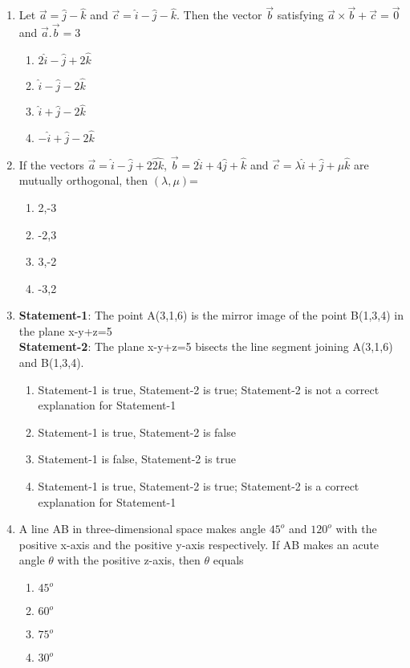 \begin{enumerate}[label=\arabic*.,ref=\thesubsection.\theenumi]
\item Let $\overrightarrow{a}=\hat{j}-\hat{k}$ and $\overrightarrow{c}=\hat{i}-\hat{j}-\hat{k}$. Then the vector $\overrightarrow{b}$ satisfying $\overrightarrow{a} \times \overrightarrow{b} + \overrightarrow{c}=\overrightarrow{0}$ and $\overrightarrow{a}.\overrightarrow{b}=3$
\begin{enumerate}
\item $2\hat{i}-\hat{j}+2\hat{k}$
\item $\hat{i}-\hat{j}-2\hat{k}$
\item $\hat{i}+\hat{j}-2\hat{k}$
\item $-\hat{i}+\hat{j}-2\hat{k}$
\end{enumerate}

\item If the vectors $\overrightarrow{a}=\hat{i}-\hat{j}+2\hat{2k}$, $\overrightarrow{b}=2\hat{i}+4\hat{j}+\hat{k}$ and $\overrightarrow{c}=\lambda\hat{i}+\hat{j}+\mu\hat{k}$ are mutually orthogonal, then $(\lambda, \mu)$=
\begin{enumerate}
\item 2,-3
\item -2,3
\item 3,-2
\item -3,2
\end{enumerate}

\item \textbf{Statement-1}: The point A(3,1,6) is the mirror image of the point B(1,3,4) in the plane x-y+z=5\\
\textbf{Statement-2}: The plane x-y+z=5 bisects the line segment joining A(3,1,6) and B(1,3,4).
\begin{enumerate}
\item Statement-1 is true, Statement-2 is true; Statement-2 is not a correct explanation for Statement-1
\item Statement-1 is true, Statement-2 is false
\item Statement-1 is false, Statement-2 is true
\item Statement-1 is true, Statement-2 is true; Statement-2 is a correct explanation for Statement-1
\end{enumerate}

\item A line AB in three-dimensional space makes angle $45^{o}$ and $120^{o}$ with the positive x-axis and the positive y-axis respectively. If AB makes an acute angle $\theta$ with the positive z-axis, then $\theta$ equals
\begin{enumerate}
\item $45^{o}$
\item $60^{o}$
\item $75^{o}$
\item $30^{o}$
\end{enumerate}


\end{enumerate}
